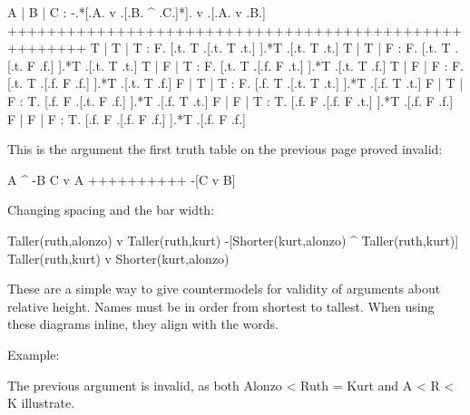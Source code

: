 \truthtable
 A | B | C : -.*[.A. v .[.B. ^ .C.]*]. v .[.A. v .B.]
++++++++++++++++++++++++++++++++++++++++++++++++++++++
 T | T | T : F. [.t. T .[.t. T .t.] ].*T .[.t. T .t.]
 T | T | F : F. [.t. T .[.t. F .f.] ].*T .[.t. T .t.]
 T | F | T : F. [.t. T .[.f. F .t.] ].*T .[.t. T .f.]
 T | F | F : F. [.t. T .[.f. F .f.] ].*T .[.t. T .f.]
 F | T | T : F. [.f. T .[.t. T .t.] ].*T .[.f. T .t.]
 F | T | F : T. [.f. F .[.t. F .f.] ].*T .[.f. T .t.]
 F | F | T : T. [.f. F .[.f. F .t.] ].*T .[.f. F .f.]
 F | F | F : T. [.f. F .[.f. F .f.] ].*T .[.f. F .f.]
\endtruthtable


\pagebreak


\endquantifiers
{}

This is the argument the first truth table on the previous page proved invalid:

\argument
 A ^ -B
 C v A
++++++++++
 -[C v B]
\endargument

\noindent Changing spacing and the bar width:

\argumentpadding=6pt%
\argumentsidepadding=6pt%
\argumentlinepadding=8pt%
\argumentlinethickness=1.6pt%

\argument
 Taller(ruth,alonzo) v Taller(ruth,kurt)
 -[Shorter(kurt,alonzo) ^ Taller(ruth,kurt)]
\argumentline
 Taller(ruth,kurt) v Shorter(kurt,alonzo)
\endargument



\unorderedlist
\li These are a simple way to give countermodels for validity of arguments about relative height.
\li Names must be in order from shortest to tallest.
\li When using these diagrams inline, they align with the words.
\endunorderedlist

\noindent Example:

\noindent The previous argument is invalid, as both
\quad
\heightmodel
 Alonzo < Ruth = Kurt
\endheightmodel
\quad and\quad
\heightmodelinitialbarheight=8pt%
\heightmodelbaradvance=4pt%
\heightmodelbarwidth=4pt%
\heightmodelspace=4pt%
\heightmodel
 A < R < K
\endheightmodel
\quad illustrate.


\bye
